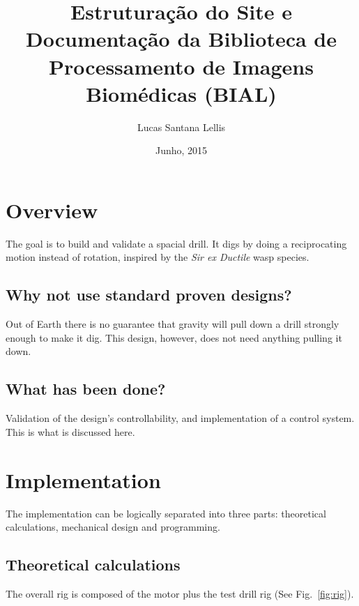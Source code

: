 \documentclass[final]{beamer}
\title[]{Estruturação do Site e Documentação da Biblioteca de Processamento de Imagens Biomédicas (BIAL)}
\author[Lucas Lellis]{Lucas Santana Lellis}
\institute[ICT - UNIFESP]{Instituto de Ciência e Tecnologia\\Universidade Federal de São Paulo}
\date{Junho, 2015}
\begin{document}
	\begin{frame}[t]{}
		\begin{multicols}{3}
			\section{Overview}
			The goal is to build and validate a spacial drill. It digs by doing a reciprocating
			motion instead of rotation, inspired by the {\em Sir ex Ductile} wasp species.
			\subsection{Why not use standard proven designs?}
			Out of Earth there is no guarantee that gravity will pull down a drill
			strongly enough to make it dig. This design, however, does not need anything pulling it down.
			
			
			\subsection{What has been done?}
			Validation of the design's controllability, and implementation of
			a control system. This is what is discussed here.
			
			\section{Implementation}
			The implementation can be logically separated into three parts:
			theoretical calculations, mechanical design and programming.
			
			\subsection{Theoretical calculations}
			The overall rig is composed of the motor plus the test drill rig (See Fig.~\ref{fig:rig}).
			

\end{multicols}
\end{frame}
\end{document}

